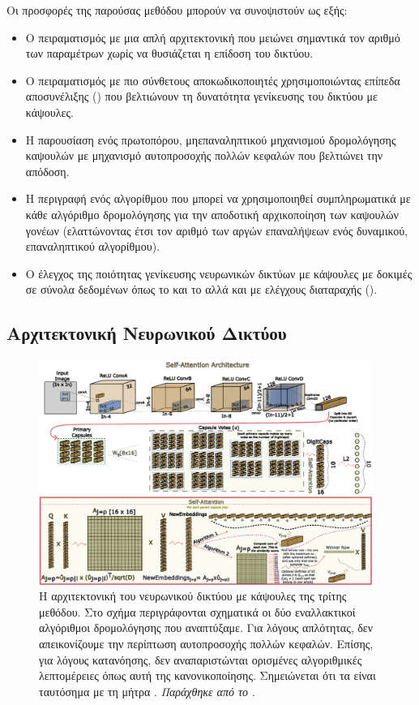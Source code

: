 Οι προσφορές της παρούσας μεθόδου μπορούν να συνοψιστούν ως εξής:
\begin{itemize}
  \item Ο πειραματισμός με μια απλή αρχιτεκτονική που μειώνει σημαντικά τον αριθμό των παραμέτρων χωρίς να θυσιάζεται η επίδοση του δικτύου.
  \item Ο πειραματισμός με πιο σύνθετους αποκωδικοποιητές χρησιμοποιώντας επίπεδα αποσυνέλιξης () που βελτιώνουν τη δυνατότητα γενίκευσης του δικτύου με κάψουλες.
  \item Η παρουσίαση ενός πρωτοπόρου, μη\textendash επαναληπτικού μηχανισμού δρομολόγησης καψουλών με μηχανισμό αυτο\textendash προσοχής πολλών κεφαλών που βελτιώνει την απόδοση.
  \item Η περιγραφή ενός αλγορίθμου που μπορεί να χρησιμοποιηθεί συμπληρωματικά με κάθε αλγόριθμο δρομολόγησης για την αποδοτική αρχικοποίηση των καψουλών γονέων (ελαττώνοντας έτσι τον αριθμό των αργών επαναλήψεων ενός δυναμικού, επαναληπτικού αλγορίθμου).
  \item Ο έλεγχος της ποιότητας γενίκευσης νευρωνικών δικτύων με κάψουλες με δοκιμές σε σύνολα δεδομένων όπως το  και το  αλλά και με ελέγχους διαταραχής ().
\end{itemize}

\subsection{Αρχιτεκτονική Νευρωνικού Δικτύου}

\begin{figure}[h]
  \centering
  \includegraphics[width=0.97\textwidth]{images/chapter method/therd_method_architecture_encoder.pdf}
  \caption{Η αρχιτεκτονική του νευρωνικού δικτύου με κάψουλες της τρίτης μεθόδου. Στο σχήμα περιγράφονται σχηματικά οι δύο εναλλακτικοί αλγόριθμοι δρομολόγησης που αναπτύξαμε. Για λόγους απλότητας, δεν απεικονίζουμε την περίπτωση αυτο\textendash προσοχής πολλών κεφαλών. Επίσης, για λόγους κατανόησης, δεν αναπαριστώνται ορισμένες αλγοριθμικές λεπτομέρειες όπως αυτή της κανονικοποίησης. Σημειώνεται ότι τα  είναι ταυτόσημα με τη μήτρα . \textit{Παράχθηκε από το \href{https://inkscape.org/}{}}.}
  \label{fig:method_3_architecture}
\end{figure}

